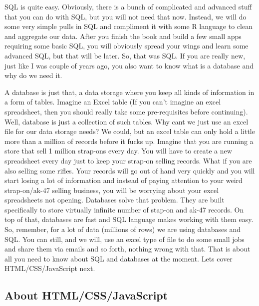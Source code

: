 \documentclass[]{book}
\begin{document}
SQL is quite easy. Obviously, there is a bunch of complicated and advanced stuff that you can do with SQL, but you will not need that now. Instead, we will do some very simple pulls in SQL and compliment it with some R language to clean and aggregate our data. After you finish the book and build a few small apps requiring some basic SQL, you will obviously spread your wings and learn some advanced SQL, but that will be later. So, that was SQL. If you are really new, just like I was couple of years ago, you also want to know what is a database and why do we need it.

A database is just that, a data storage where you keep all kinds of information in a form of tables. Imagine an Excel table (If you can't imagine an excel spreadsheet, then you should really take some pre-requisites before continuing). Well, database is just a collection of such tables. Why cant we just use an excel file for our data storage needs? We could, but an excel table can only hold a little more than a million of records before it fucks up. Imagine that you are running a store that sell 1 million strap-ons every day. You will have to create a new spreadsheet every day just to keep your strap-on selling records. What if you are also selling some rifles. Your records will go out of hand very quickly and you will start losing a lot of information and instead of paying attention to your weird strap-on/ak-47 selling business, you will be worrying about your excel spreadsheets not opening. Databases solve that problem. They are built specifically to store virtually infinite number of stap-on and ak-47 records. On top of that, databases are fast and SQL language makes working with them easy. So, remember, for a lot of data (millions of rows) we are using databases and SQL. You can still, and we will, use an excel type of file to do some small jobs and share them via emails and so forth, nothing wrong with that. That is about all you need to know about SQL and databases at the moment. Lets cover HTML/CSS/JavaScript next.

\hypertarget{about-htmlcssjavascript}{%
\subsection{About HTML/CSS/JavaScript}\label{about-htmlcssjavascript}}
\end{document}

